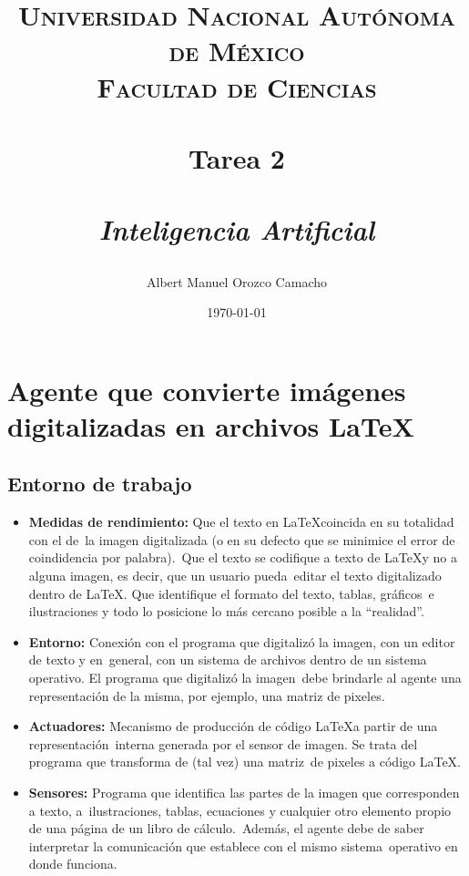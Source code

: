 \documentclass[paper=letter, fontsize=12pt]{scrartcl} %
\title{
  \vspace*{\fill}
  \begin{center}
    \normalfont \normalsize
    \textsc{Universidad Nacional Autónoma de México\\Facultad de Ciencias} \\ [25pt]
    \horrule{0.5pt} \\[0.4cm] %
    \huge \textbf{Tarea 2} \\ %
    \horrule{2pt} \\[0.5cm] %
    \large \textit{Inteligencia Artificial} \\
  \end{center}
}
\author{Albert Manuel Orozco Camacho} %
\date{\normalsize\today} %
\numberwithin{equation}{section} %
\numberwithin{figure}{section} %
\numberwithin{table}{section} %
\begin{document}
\begin{titlepage}
  \maketitle
  \thispagestyle{empty}
  \vspace*{\fill}
\end{titlepage}


\section{Agente que convierte imágenes digitalizadas en archivos \LaTeX}

\subsection{Entorno de trabajo}

\begin{itemize}
\item \textbf{Medidas de rendimiento:} Que el texto en \LaTeX   coincida en su totalidad con el de\
  la imagen digitalizada (o en su defecto que se minimice el error de coindidencia por palabra).\
  Que el texto se codifique a texto de \LaTeX   y no a alguna imagen, es decir, que un usuario pueda\
  editar el texto digitalizado dentro de \LaTeX. Que identifique el formato del texto, tablas, gráficos\
  e ilustraciones y todo lo posicione lo más cercano posible a la ``realidad''.
\item \textbf{Entorno:} Conexión con el programa que digitalizó la imagen, con un editor de texto y en\
  general, con un sistema de archivos dentro de un sistema operativo. El programa que digitalizó la imagen\
  debe brindarle al agente una representación de la misma, por ejemplo, una matriz de pixeles.
\item \textbf{Actuadores:} Mecanismo de producción de código \LaTeX   a partir de una representación\
  interna generada por el sensor de imagen. Se trata del programa que transforma de (tal vez) una matriz\
  de pixeles a código \LaTeX.
\item \textbf{Sensores:} Programa que identifica las partes de la imagen que corresponden a texto, a\
  ilustraciones, tablas, ecuaciones y cualquier otro elemento propio de una página de un libro de cálculo.\
  Además, el agente debe de saber interpretar la comunicación que establece con el mismo sistema\
  operativo en donde funciona.
\end{itemize}
\end{document}
